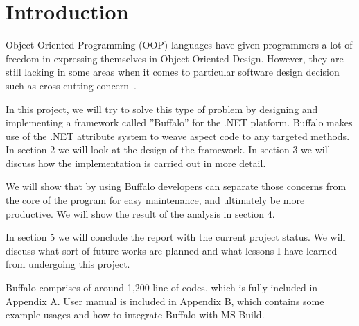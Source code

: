 \chapter{Introduction}

Object Oriented Programming (OOP) languages have given programmers a lot of freedom in expressing themselves in Object Oriented Design. However, they are still lacking in some areas when it comes to particular software design decision such as cross-cutting concern~\cite{aop}.

In this project, we will try to solve this type of problem by designing and implementing a framework called ”Buffalo” for the .NET platform. Buffalo makes use of the .NET attribute system to weave aspect code to any targeted methods. In section 2 we will look at the design of the framework. In section 3 we will discuss how the implementation is carried out in more detail.

We will show that by using Buffalo developers can separate those concerns from the core of the program for easy maintenance, and ultimately be more productive. We will show the result of the analysis in section 4.

In section 5 we will conclude the report with the current project status. We will discuss what sort of future works are planned and what lessons I have learned from undergoing this project.

Buffalo comprises of around 1,200 line of codes, which is fully included in Appendix A. User manual is included in Appendix B, which contains some example usages and how to integrate Buffalo with MS-Build.
